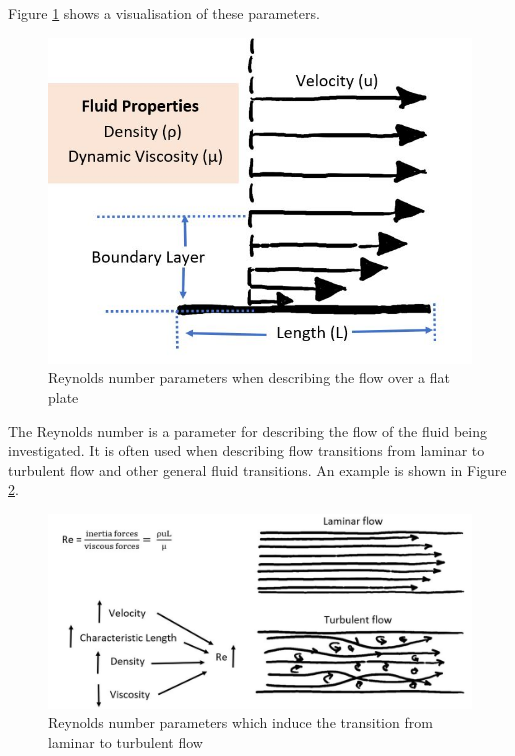 Figure \ref{fig:Repipe} shows a visualisation of these parameters. 

\begin{figure}[H]
    \centering
    \includegraphics[scale=0.75]{02_Background/Figs/BoundaryLayerUpdated.JPG}
    \caption{Reynolds number parameters when describing the flow over a flat plate}
    \label{fig:Repipe}
\end{figure}

The Reynolds number is a parameter for describing the flow of the fluid being investigated. It is often used when describing flow transitions from laminar to turbulent flow and other general fluid transitions. An example is shown in Figure \ref{fig:Re2}.


\begin{figure}[H]
    \centering
    \includegraphics[scale=0.75]{02_Background/Figs/flowType2.JPG}
   \caption{Reynolds number parameters which induce the transition from laminar to turbulent flow}
    \label{fig:Re2}
\end{figure}


